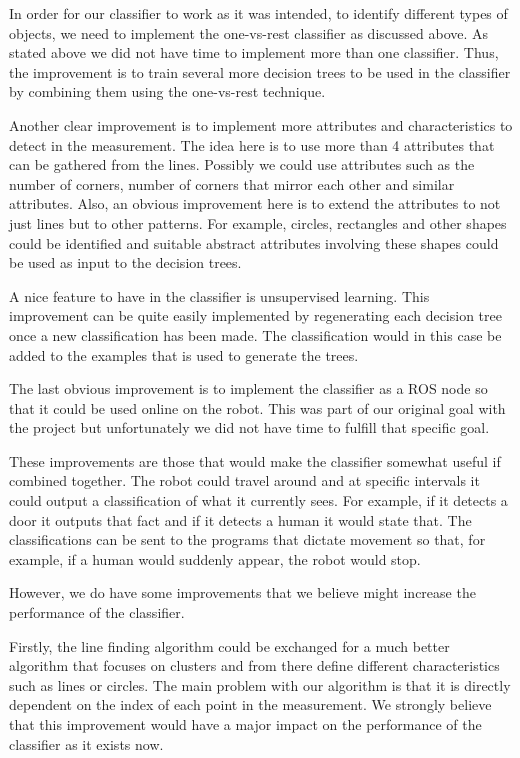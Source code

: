 \documentclass[a4paper, 10pt, conference]{ieeeconf}      %
\begin{document}
In order for our classifier to work as it was intended, to identify different types of objects, we need to implement the one-vs-rest classifier as discussed above. As stated above we did not have time to implement more than one classifier. Thus, the improvement is to train several more decision trees to be used in the classifier by combining them using the one-vs-rest technique.

Another clear improvement is to implement more attributes and characteristics to detect in the measurement. The idea here is to use more than 4 attributes that can be gathered from the lines. Possibly we could use attributes such as the number of corners, number of corners that mirror each other and similar attributes. Also, an obvious improvement here is to extend the attributes to not just lines but to other patterns. For example, circles, rectangles and other shapes could be identified and suitable abstract attributes involving these shapes could be used as input to the decision trees.

A nice feature to have in the classifier is unsupervised learning. This improvement can be quite easily implemented by regenerating each decision tree once a new classification has been made. The classification would in this case be added to the examples that is used to generate the trees.

The last obvious improvement is to implement the classifier as a ROS node so that it could be used online on the robot. This was part of our original goal with the project but unfortunately we did not have time to fulfill that specific goal.

These improvements are those that would make the classifier somewhat useful if combined together. The robot could travel around and at specific intervals it could output a classification of what it currently sees. For example, if it detects a door it outputs that fact and if it detects a human it would state that. The classifications can be sent to the programs that dictate movement so that, for example, if a human would suddenly appear, the robot would stop.

However, we do have some improvements that we believe might increase the performance of the classifier.

Firstly, the line finding algorithm could be exchanged for a much better algorithm that focuses on clusters and from there define different characteristics such as lines or circles. The main problem with our algorithm is that it is directly dependent on the index of each point in the measurement. We strongly believe that this improvement would have a major impact on the performance of the classifier as it exists now.
\end{document}

